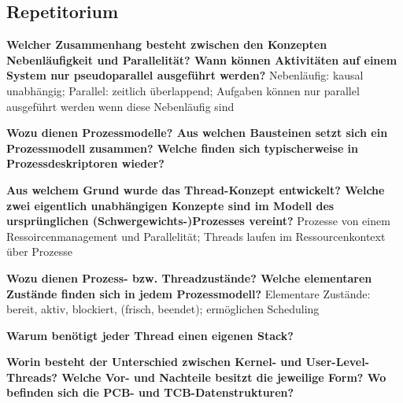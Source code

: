 \documentclass[a4paper]{article}
\begin{document}
\subsection{Repetitorium}
\begin{itemize*}
    \item \textbf{Welcher Zusammenhang besteht zwischen den Konzepten Nebenläufigkeit und Parallelität? Wann können Aktivitäten auf einem System nur pseudoparallel ausgeführt werden?} Nebenläufig: kausal unabhängig; Parallel: zeitlich überlappend; Aufgaben können nur parallel ausgeführt werden wenn diese Nebenläufig sind
    \item \textbf{Wozu dienen Prozessmodelle? Aus welchen Bausteinen setzt sich ein Prozessmodell zusammen? Welche finden sich typischerweise in Prozessdeskriptoren wieder?} 
    \item \textbf{Aus welchem Grund wurde das Thread-Konzept entwickelt? Welche zwei eigentlich unabhängigen Konzepte sind im Modell des ursprünglichen (Schwergewichts-)Prozesses vereint?} Prozesse von einem Ressoircenmanagement und Parallelität; Threads laufen im Ressourcenkontext über Prozesse
    \item \textbf{Wozu dienen Prozess- bzw. Threadzustände? Welche elementaren Zustände finden sich in jedem Prozessmodell?} Elementare Zustände: bereit, aktiv, blockiert, (frisch, beendet); ermöglichen Scheduling
    \item \textbf{Warum benötigt jeder Thread einen eigenen Stack?} 
    \item \textbf{Worin besteht der Unterschied zwischen Kernel- und User-Level-Threads? Welche Vor- und Nachteile besitzt die jeweilige Form? Wo befinden sich die PCB- und TCB-Datenstrukturen?} 
\end{itemize*}
\end{document}
